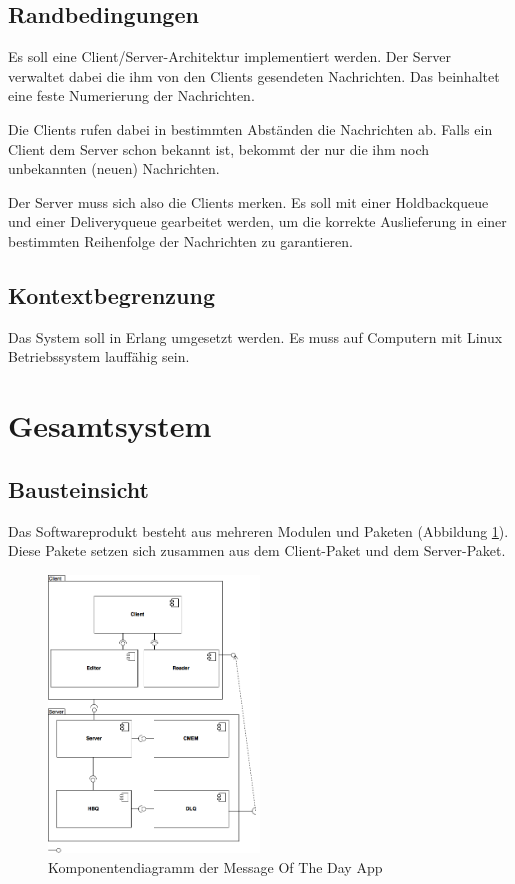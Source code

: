 \documentclass{article}
\begin{document}
\subsection{Randbedingungen}
Es soll eine Client/Server-Architektur implementiert werden.
Der Server verwaltet dabei die ihm von den Clients gesendeten Nachrichten. Das beinhaltet eine feste Numerierung der Nachrichten.

Die Clients rufen dabei in bestimmten Abständen die Nachrichten ab. Falls ein Client dem Server schon bekannt ist, bekommt der nur die ihm noch unbekannten (neuen) Nachrichten.

Der Server muss sich also die Clients merken. Es soll mit einer Holdbackqueue und einer Deliveryqueue gearbeitet werden, um die korrekte Auslieferung in einer bestimmten Reihenfolge der Nachrichten zu garantieren.

\subsection{Kontextbegrenzung}
Das System soll in Erlang umgesetzt werden. Es muss auf Computern mit Linux Betriebssystem lauffähig sein.

\newpage

\section{Gesamtsystem}

\subsection{Bausteinsicht}
Das Softwareprodukt besteht aus mehreren Modulen und Paketen (Abbildung \ref{fig:component-diagram}). Diese Pakete setzen sich zusammen aus dem Client-Paket und dem Server-Paket.

\begin{figure}[H]
    \centering
    \includegraphics[width=0.5\textwidth]{component-diagram.png}
    \caption[seq-dia]{Komponentendiagramm der Message Of The Day App}
    \label{fig:component-diagram}
\end{figure}
\end{document}
